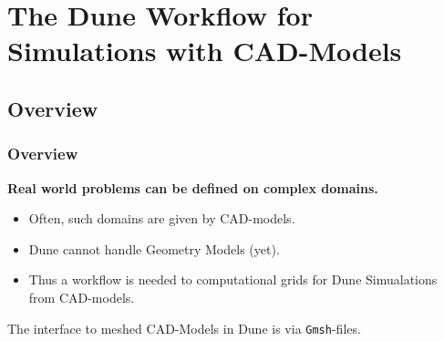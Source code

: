\section{The Dune Workflow for Simulations with CAD-Models}\label{Sec:Workflow}

\subsection{Overview}

\begin{frame}
  \frametitle<presentation>{Overview}
  \textbf{Real world problems can be defined on complex domains.}
  \begin{itemize}
    \item Often, such domains are given by CAD-models.
    \item Dune cannot handle Geometry Models (yet).
    \item Thus a workflow is needed to computational grids for Dune Simualations
      from CAD-models.
  \end{itemize}
  The interface to meshed CAD-Models in Dune is via \lstinline!Gmsh!-files.
\end{frame}

